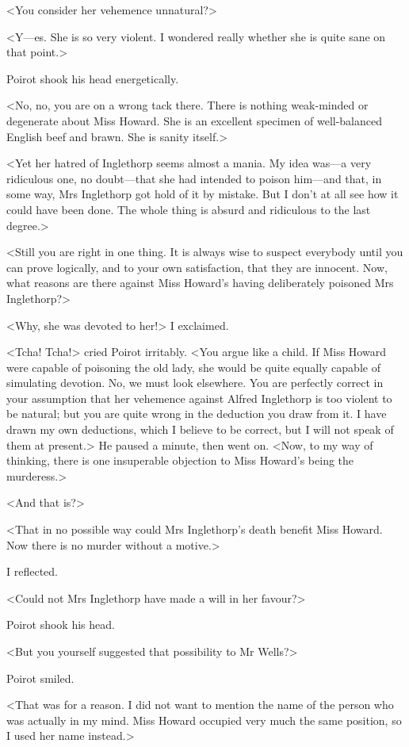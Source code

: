  <You consider her vehemence unnatural?> 

 <Y—es. She is so very violent. I wondered really whether she is quite sane on that point.> 

 Poirot shook his head energetically. 

 <No, no, you are on a wrong tack there. There is nothing weak-minded or degenerate about Miss Howard. She is an excellent specimen of well-balanced English beef and brawn. She is sanity itself.> 

 <Yet her hatred of Inglethorp seems almost a mania. My idea was—a very ridiculous one, no doubt—that she had intended to poison him—and that, in some way, Mrs Inglethorp got hold of it by mistake. But I don't at all see how it could have been done. The whole thing is absurd and ridiculous to the last degree.> 

 <Still you are right in one thing. It is always wise to suspect everybody until you can prove logically, and to your own satisfaction, that they are innocent. Now, what reasons are there against Miss Howard's having deliberately poisoned Mrs Inglethorp?> 

 <Why, she was devoted to her!> I exclaimed. 

 <Tcha! Tcha!> cried Poirot irritably. <You argue like a child. If Miss Howard were capable of poisoning the old lady, she would be quite equally capable of simulating devotion. No, we must look elsewhere. You are perfectly correct in your assumption that her vehemence against Alfred Inglethorp is too violent to be natural; but you are quite wrong in the deduction you draw from it. I have drawn my own deductions, which I believe to be correct, but I will not speak of them at present.> He paused a minute, then went on. <Now, to my way of thinking, there is one insuperable objection to Miss Howard's being the murderess.> 

 <And that is?> 

 <That in no possible way could Mrs Inglethorp's death benefit Miss Howard. Now there is no murder without a motive.> 

 I reflected. 

 <Could not Mrs Inglethorp have made a will in her favour?> 

 Poirot shook his head. 

 <But you yourself suggested that possibility to Mr Wells?> 

 Poirot smiled. 

 <That was for a reason. I did not want to mention the name of the person who was actually in my mind. Miss Howard occupied very much the same position, so I used her name instead.> 

